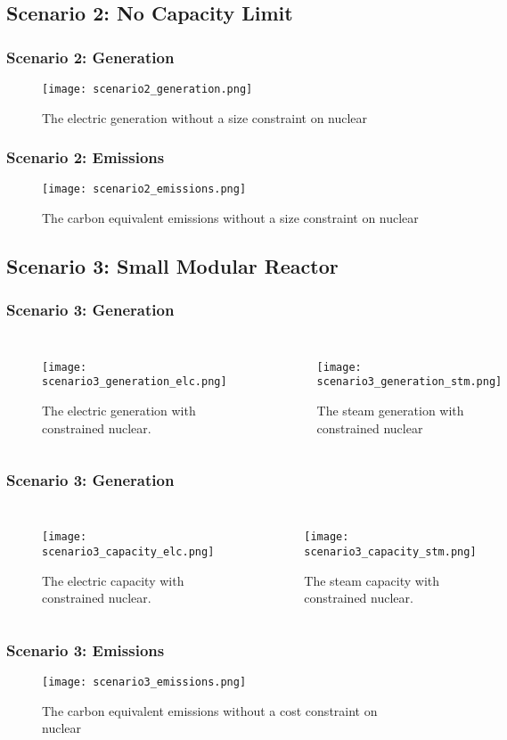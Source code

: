 \subsection{Scenario 2: No Capacity Limit}
\begin{frame}
  \frametitle{Scenario 2: Generation}
  \begin{figure}
    \texttt{[image: scenario2\_generation.png]}
    \caption{The electric generation without a size constraint on nuclear}
    \label{fig:gen02}
  \end{figure}
\end{frame}
\begin{frame}
  \frametitle{Scenario 2: Emissions}
  \begin{figure}
    \texttt{[image: scenario2\_emissions.png]}
    \caption{The carbon equivalent emissions without a size constraint on nuclear}
    \label{fig:emit02}
  \end{figure}
\end{frame}
\subsection{Scenario 3: Small Modular Reactor}
\begin{frame}
  \frametitle{Scenario 3: Generation}
  \begin{columns}
    \column[t]{5cm}
    \begin{figure}
      \texttt{[image: scenario3\_generation\_elc.png]}
      \caption{The electric generation with constrained nuclear.}
      \label{fig:gen03elc}
    \end{figure}
    \column[t]{5cm}
    \begin{figure}
      \texttt{[image: scenario3\_generation\_stm.png]}
      \caption{The steam generation with constrained nuclear}
      \label{fig:gen02stm}
    \end{figure}
  \end{columns}
\end{frame}
\begin{frame}
  \frametitle{Scenario 3: Generation}
  \begin{columns}
    \column[t]{5cm}
    \begin{figure}
      \texttt{[image: scenario3\_capacity\_elc.png]}
      \caption{The electric capacity with constrained nuclear.}
      \label{fig:cap03elc}
    \end{figure}
    \column[t]{5cm}
    \begin{figure}
      \texttt{[image: scenario3\_capacity\_stm.png]}
      \caption{The steam capacity with constrained nuclear.}
      \label{fig:cap02stm}
    \end{figure}
  \end{columns}
\end{frame}
\begin{frame}
  \frametitle{Scenario 3: Emissions}
  \begin{figure}
    \texttt{[image: scenario3\_emissions.png]}
    \caption{The carbon equivalent emissions without a cost constraint on nuclear}
    \label{fig:emit03}
  \end{figure}
\end{frame}
